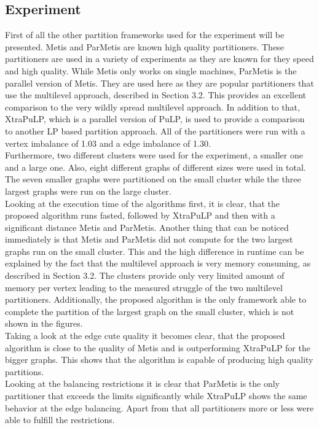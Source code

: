 \documentclass[acmsmall,nonacm,screen,review]{acmart}
\begin{document}
\subsection{Experiment}
First of all the other partition frameworks used for the experiment will be presented. Metis and ParMetis are known high quality partitioners. These partitioners are used in a variety of experiments as they are known for they speed and high quality. While Metis only works on single machines, ParMetis is the parallel version of Metis. They are used here as they are popular partitioners that use the multilevel approach, described in Section 3.2. This provides an excellent comparison to the very wildly spread multilevel approach. In addition to that, XtraPuLP, which is a parallel version of PuLP, is used to provide a comparison to another LP based partition approach. All of the partitioners were run with a vertex imbalance of 1.03 and a edge imbalance of 1.30.\\
Furthermore, two different clusters were used for the experiment, a smaller one and a large one. Also, eight different graphs of different sizes were used in total. The seven smaller graphs were partitioned on the small cluster while the three largest graphs were run on the large cluster.\\
Looking at the execution time of the algorithms first, it is clear, that the proposed algorithm runs fasted, followed by XtraPuLP and then with a significant distance Metis and ParMetis. Another thing that can be noticed immediately is that Metis and ParMetis did not compute for the two largest graphs run on the small cluster. This and the high difference in runtime can be explained by the fact that the multilevel approach is very memory consuming, as described in Section 3.2. The clusters provide only very limited amount of memory per vertex leading to the measured struggle of the two multilevel partitioners. Additionally, the proposed algorithm is the only framework able to complete the partition of the largest graph on the small cluster, which is not shown in the figures. \\
Taking a look at the edge cute quality it becomes clear, that the proposed algorithm is close to the quality of Metis and is outperforming XtraPuLP for the bigger graphs. This shows that the algorithm is capable of producing high quality partitions.\\
Looking at the balancing restrictions it is clear that ParMetis is the only partitioner that exceeds the limits significantly while XtraPuLP shows the same behavior at the edge balancing. Apart from that all partitioners more or less were able to fulfill the restrictions.\\
\end{document}
